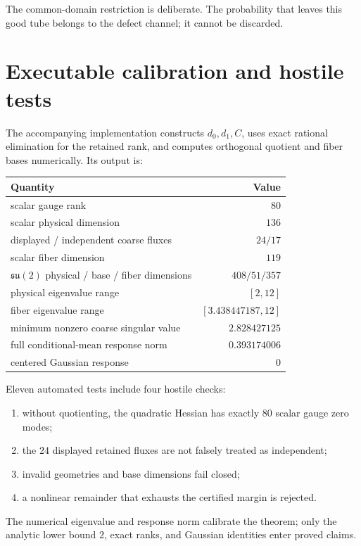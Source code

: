 \documentclass[11pt]{article}
\newcommand{\su}{\mathfrak{su}(2)}
\theoremstyle{remark}
\begin{document}
The common-domain restriction is deliberate.  The probability that leaves
this good tube belongs to the defect channel; it cannot be discarded.

\section{Executable calibration and hostile tests}

The accompanying implementation constructs $d_0,d_1,C$, uses exact rational
elimination for the retained rank, and computes orthogonal quotient and fiber
bases numerically.  Its output is:

\begin{center}
\begin{tabular}{@{}lr@{}}
\toprule
Quantity & Value\\
\midrule
scalar gauge rank & $80$\\
scalar physical dimension & $136$\\
displayed / independent coarse fluxes & $24/17$\\
scalar fiber dimension & $119$\\
$\su$ physical / base / fiber dimensions & $408/51/357$\\
physical eigenvalue range & $[2,12]$\\
fiber eigenvalue range & $[3.438447187,12]$\\
minimum nonzero coarse singular value & $2.828427125$\\
full conditional-mean response norm & $0.393174006$\\
centered Gaussian response & $0$\\
\bottomrule
\end{tabular}
\end{center}

Eleven automated tests include four hostile checks:
\begin{enumerate}
\item without quotienting, the quadratic Hessian has exactly $80$ scalar
      gauge zero modes;
\item the $24$ displayed retained fluxes are not falsely treated as
      independent;
\item invalid geometries and base dimensions fail closed;
\item a nonlinear remainder that exhausts the certified margin is rejected.
\end{enumerate}

The numerical eigenvalue and response norm calibrate the theorem; only the
analytic lower bound $2$, exact ranks, and Gaussian identities enter proved
claims.
\end{document}
